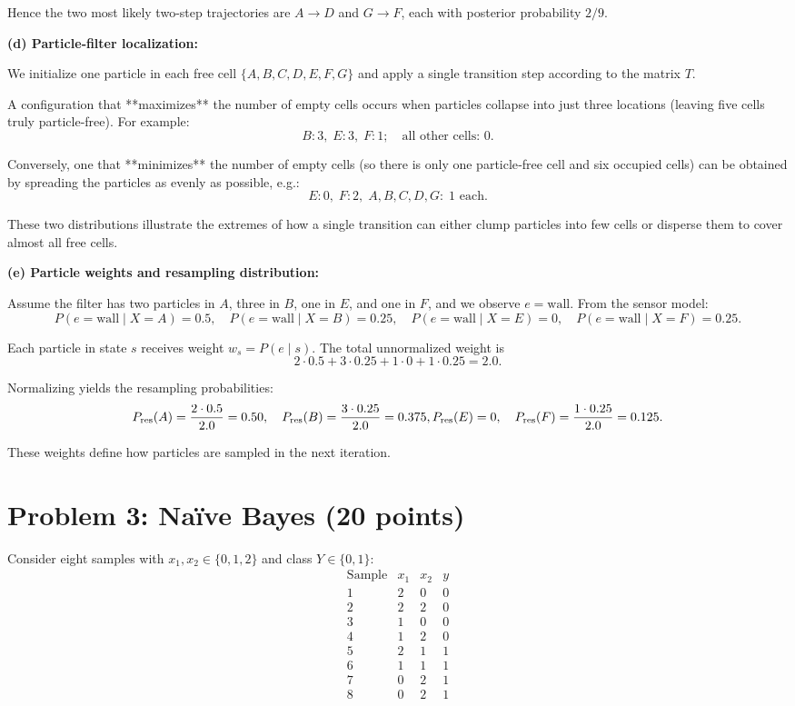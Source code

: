 \documentclass[11pt]{article}
\begin{document}
Hence the two most likely two-step trajectories are
\(\boxed{A\!\to\!D}\) and \(\boxed{G\!\to\!F}\), each with posterior
probability \(2/9\).

\bigskip
\noindent\textbf{(d) Particle‐filter localization:}

We initialize one particle in each free cell $\{A,B,C,D,E,F,G\}$ and apply a single transition step according to the matrix $T$.

A configuration that **maximizes** the number of empty cells occurs when particles collapse into just three locations (leaving five cells truly particle‐free).  For example:
\[
  B:3,\;E:3,\;F:1;\quad\text{all other cells: }0.
\]

Conversely, one that **minimizes** the number of empty cells (so there is only one particle‐free cell and six occupied cells) can be obtained by spreading the particles as evenly as possible, e.g.:
\[
  E:0,\;F:2,\;A,B,C,D,G:\;1\text{ each}.
\]

These two distributions illustrate the extremes of how a single transition can either clump particles into few cells or disperse them to cover almost all free cells.

\bigskip
\noindent\textbf{(e) Particle weights and resampling distribution:}

Assume the filter has two particles in $A$, three in $B$, one in $E$, and one in $F$, and we observe $e=\text{wall}$.  From the sensor model:
\[
  P(e=\text{wall}\mid X= A)=0.5,\quad
  P(e=\text{wall}\mid X= B)=0.25,\quad
  P(e=\text{wall}\mid X= E)=0,\quad
  P(e=\text{wall}\mid X= F)=0.25.
\]

Each particle in state $s$ receives weight $w_s=P(e\mid s)$.  The total unnormalized weight is
\[
  2\cdot0.5 + 3\cdot0.25 + 1\cdot0 + 1\cdot0.25 = 2.0.
\]

Normalizing yields the resampling probabilities:
\[
  P_{\mathrm{res}}(A)=\frac{2\cdot0.5}{2.0}=0.50,\quad
  P_{\mathrm{res}}(B)=\frac{3\cdot0.25}{2.0}=0.375,\\
  P_{\mathrm{res}}(E)=0,\quad
  P_{\mathrm{res}}(F)=\frac{1\cdot0.25}{2.0}=0.125.
\]

These weights define how particles are sampled in the next iteration.

\bigskip
\section*{Problem 3: Naïve Bayes (20 points)}

Consider eight samples with $x_1,x_2\in\{0,1,2\}$ and class $Y\in\{0,1\}$:
\[
\begin{array}{c|ccc}
\text{Sample}&x_1&x_2&y\\\hline
1&2&0&0\\
2&2&2&0\\
3&1&0&0\\
4&1&2&0\\
5&2&1&1\\
6&1&1&1\\
7&0&2&1\\
8&0&2&1
\end{array}
\]
\end{document}

